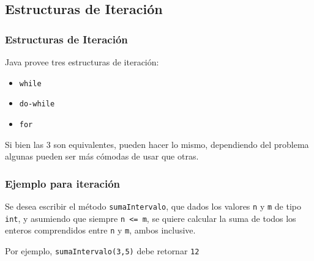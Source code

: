 \documentclass{beamer}
\newcommand{\code}[1]{\texttt{#1}}
\newcommand{\codet}[1]{\texttt{#1}}
\begin{document}
\subsection{Estructuras de Iteración}

\begin{frame}
  \frametitle{Estructuras de Iteración}

  Java provee tres estructuras de iteración:
  
  \begin{itemize}
  \item \codet{while}
  \item \codet{do-while}
  \item \codet{for}
  \end{itemize}

  Si bien las 3 son equivalentes, pueden hacer lo mismo, dependiendo
  del problema algunas pueden ser más cómodas de usar que otras.
  
\end{frame}

\begin{frame}
  \frametitle{Ejemplo para iteración}

  \begin{block}{}
    Se desea escribir el método \code{sumaIntervalo}, que dados los
    valores \code{n} y \code{m} de tipo \code{int}, y asumiendo que
    siempre \code{n <= m}, se quiere calcular la suma de todos los
    enteros comprendidos entre \code{n} y \code{m}, ambos inclusive.
  \end{block}

  \begin{exampleblock}{}
    Por ejemplo, \code{sumaIntervalo(3,5)} debe retornar \code{12}  
  \end{exampleblock}

\end{frame}
\end{document}
